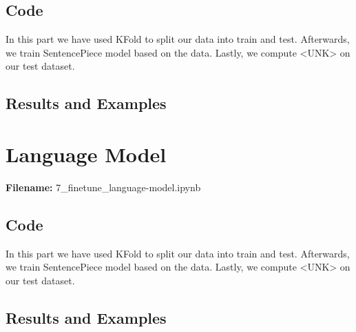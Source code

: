 \documentclass[12pt, a4paper]{article}
\begin{document}
\subsection*{Code}
In this part we have used KFold to split our data into train and test. Afterwards, we train SentencePiece model based on the data. Lastly, we compute <UNK> on our test dataset. 

\subsection*{Results and Examples}
\section*{Language Model}
\large{\textbf{Filename:} 7\_finetune\_language-model.ipynb}

\subsection*{Code}
In this part we have used KFold to split our data into train and test. Afterwards, we train SentencePiece model based on the data. Lastly, we compute <UNK> on our test dataset. 

\subsection*{Results and Examples}

%


\newpage
\end{document}
